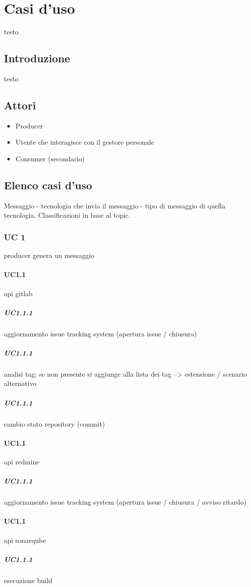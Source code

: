 \section{Casi d'uso}
testo

	\subsection{Introduzione}
	testo
	
	\subsection{Attori}
	\begin{itemize}
		\item Producer
		\item Utente che interagisce con il gestore personale
		\item Consumer (secondario)
	\end{itemize}
	
	\subsection{Elenco casi d'uso}
	Messaggio - tecnologia che invia il messaggio - tipo di messaggio di quella tecnologia.
	Classificazioni in base al topic.

\subsubsection{UC 1}
producer genera un messaggio
	\paragraph{UC1.1}
	api gitlab
		\subparagraph{UC1.1.1}
		aggiornamento issue tracking system (apertura issue / chiusura)
		\subparagraph{UC1.1.1}
		analisi tag:
			se non presente {si aggiunge alla lista dei tag} --> estensione / scenario alternativo
		\subparagraph{UC1.1.1}
		cambio stato repository (commit)

	\paragraph{UC1.1}
	api redmine
		\subparagraph{UC1.1.1}
		aggiornamento issue tracking system (apertura issue / chiusura / avviso ritardo)

	\paragraph{UC1.1}
	api sonarqube
		\subparagraph{UC1.1.1}
		esecuzione build


